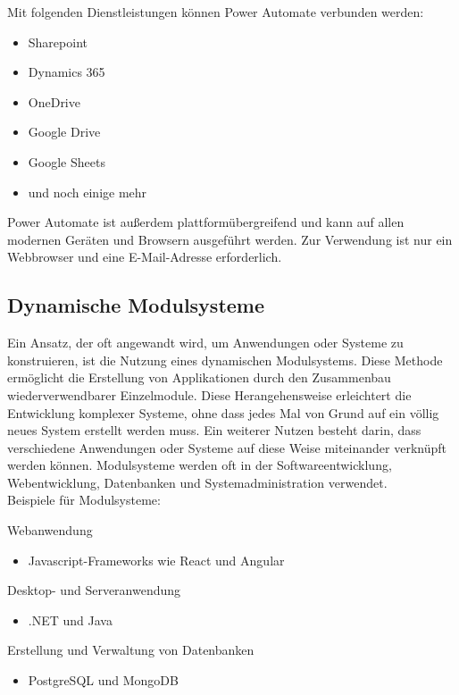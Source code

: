 Mit folgenden Dienstleistungen können Power Automate verbunden werden:

\begin{itemize}
    \item Sharepoint
    \item Dynamics 365
    \item OneDrive
    \item Google Drive
    \item Google Sheets
    \item und noch einige mehr
\end{itemize}

Power Automate ist außerdem plattformübergreifend und kann auf allen modernen Geräten und Browsern
ausgeführt werden. Zur Verwendung ist nur ein Webbrowser und eine E-Mail-Adresse erforderlich.

\newpage
\subsection*{Dynamische Modulsysteme}

Ein Ansatz, der oft angewandt wird, um Anwendungen oder Systeme zu konstruieren, 
ist die Nutzung eines dynamischen Modulsystems. Diese Methode ermöglicht die Erstellung 
von Applikationen durch den Zusammenbau wiederverwendbarer Einzelmodule. 
Diese Herangehensweise erleichtert die Entwicklung komplexer Systeme, ohne dass jedes 
Mal von Grund auf ein völlig neues System erstellt werden muss. Ein weiterer Nutzen besteht darin, 
dass verschiedene Anwendungen oder Systeme auf diese Weise miteinander verknüpft werden können.
Modulsysteme werden oft in der Softwareentwicklung, Webentwicklung, 
Datenbanken und Systemadministration verwendet.\\

Beispiele für Modulsysteme:

Webanwendung
\begin{itemize}
    \item Javascript-Frameworks wie React und Angular
\end{itemize}

Desktop- und Serveranwendung
\begin{itemize}
    \item .NET und Java
\end{itemize}

Erstellung und Verwaltung von Datenbanken
\begin{itemize}
    \item PostgreSQL und MongoDB
\end{itemize}

